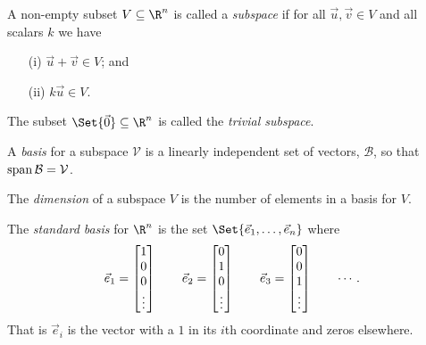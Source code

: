 \begin{SaveDefinition}[key=Subspace, title={Subspace}]
	A non-empty subset $V\subseteq \R^{n}$ is called a \emph{subspace} if for all $\vec u,\vec v\in V$ and all
	scalars $k$ we have
	\begin{enumerate}
		\item[(i)] $\vec u+\vec v\in V$; and

		\item[(ii)] $k\vec u\in V$.
	\end{enumerate}
\end{SaveDefinition}

\begin{SaveDefinition}[key=TrivialSubspace, title={Trivial Subspace}]
	The subset $\Set{\vec 0}\subseteq\R^n$ is called the \emph{trivial subspace}.
\end{SaveDefinition}

\begin{SaveDefinition}[key=Basis, title={Basis}]
	A
	\emph{basis} for a subspace $\mathcal V$ is a linearly independent set of vectors,
	$\mathcal B$, so that $\operatorname{span}\mathcal B=\mathcal V$.
\end{SaveDefinition}

\begin{SaveDefinition}[key=Dimension, title={Dimension}]
	The
	\emph{dimension} of a subspace $V$ is the number of elements in a basis
	for $V$.
\end{SaveDefinition}

\begin{SaveDefinition}[key=StandardBasisforRn, title={Standard Basis}]
	The \emph{standard basis} for $\R^n$ is the set $\Set{\vec e_1,\ldots,\vec e_n}$ where
	\[
		\vec e_1=\begin{bmatrix}1\\0\\0\\\vdots\end{bmatrix}\qquad
		\vec e_2=\begin{bmatrix}0\\1\\0\\\vdots\end{bmatrix}\qquad
		\vec e_3=\begin{bmatrix}0\\0\\1\\\vdots\end{bmatrix}\qquad\cdots.
	\]
	That is $\vec e_i$ is the vector with a $1$ in its
	$i$th coordinate and zeros elsewhere.
\end{SaveDefinition}

